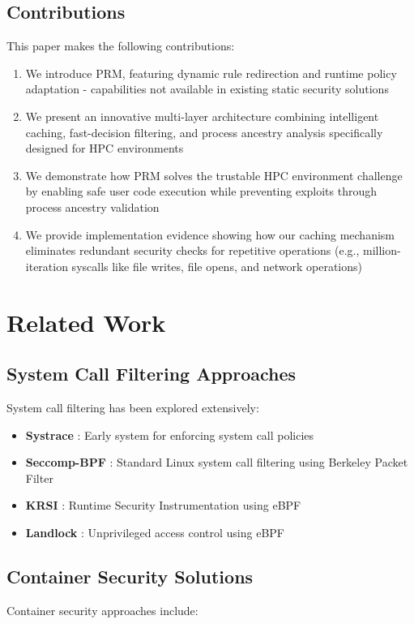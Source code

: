 \documentclass[conference]{IEEEtran}
\begin{document}
\subsection{Contributions}
This paper makes the following contributions:
\begin{enumerate}
\item We introduce PRM, featuring dynamic rule redirection and runtime policy adaptation - capabilities not available in existing static security solutions
\item We present an innovative multi-layer architecture combining intelligent caching, fast-decision filtering, and process ancestry analysis specifically designed for HPC environments
\item We demonstrate how PRM solves the trustable HPC environment challenge by enabling safe user code execution while preventing exploits through process ancestry validation
\item We provide implementation evidence showing how our caching mechanism eliminates redundant security checks for repetitive operations (e.g., million-iteration syscalls like file writes, file opens, and network operations)
\end{enumerate}

\section{Related Work}
\label{sec:related}

\subsection{System Call Filtering Approaches}
System call filtering has been explored extensively:

\begin{itemize}
\item \textbf{Systrace} \cite{provos2003improving}: Early system for enforcing system call policies
\item \textbf{Seccomp-BPF} \cite{edge2015seccomp}: Standard Linux system call filtering using Berkeley Packet Filter
\item \textbf{KRSI} \cite{singh2019krsi}: Runtime Security Instrumentation using eBPF
\item \textbf{Landlock} \cite{salvan2016landlock}: Unprivileged access control using eBPF
\end{itemize}

\subsection{Container Security Solutions}
Container security approaches include:
\end{document}

